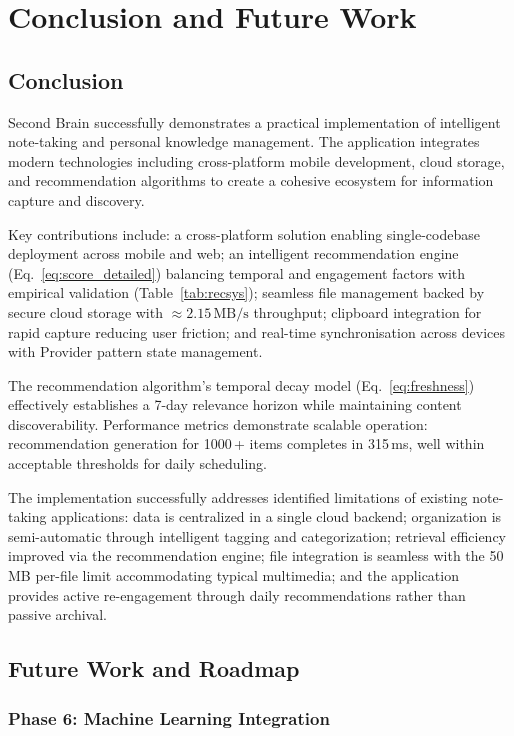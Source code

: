 \documentclass[10pt,twocolumn,a4paper]{article}
\begin{document}
\begin{table}[h]
\section{Conclusion and Future Work}

\subsection{Conclusion}

Second Brain successfully demonstrates a practical implementation of intelligent note-taking
and personal knowledge management. The application integrates modern technologies including
cross-platform mobile development, cloud storage, and recommendation algorithms to create a
cohesive ecosystem for information capture and discovery.

Key contributions include: a cross-platform solution enabling single-codebase deployment
across mobile and web; an intelligent recommendation engine (Eq.~\ref{eq:score_detailed})
balancing temporal and engagement factors with empirical validation (Table~\ref{tab:recsys});
seamless file management backed by secure cloud storage with $\approx 2.15\,\text{MB/s}$
throughput; clipboard integration for rapid capture reducing user friction; and real-time
synchronisation across devices with Provider pattern state management.

The recommendation algorithm's temporal decay model (Eq.~\ref{eq:freshness}) effectively
establishes a 7-day relevance horizon while maintaining content discoverability. Performance
metrics demonstrate scalable operation: recommendation generation for 1000\,+ items completes
in 315\,ms, well within acceptable thresholds for daily scheduling.

The implementation successfully addresses identified limitations of existing note-taking
applications: data is centralized in a single cloud backend; organization is semi-automatic
through intelligent tagging and categorization; retrieval efficiency improved via the
recommendation engine; file integration is seamless with the 50\,MB per-file limit accommodating
typical multimedia; and the application provides active re-engagement through daily
recommendations rather than passive archival.

\subsection{Future Work and Roadmap}

\subsubsection{Phase 6: Machine Learning Integration}


\end{table}
\end{document}
